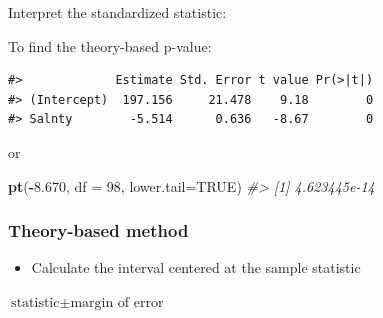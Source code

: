 \documentclass[
]{report}
\newenvironment{Shaded}{\begin{snugshade}}{\end{snugshade}}
\newcommand{\AttributeTok}[1]{\textcolor[rgb]{0.13,0.29,0.53}{#1}}
\newcommand{\CommentTok}[1]{\textcolor[rgb]{0.56,0.35,0.01}{\textit{#1}}}
\newcommand{\ConstantTok}[1]{\textcolor[rgb]{0.56,0.35,0.01}{#1}}
\newcommand{\DecValTok}[1]{\textcolor[rgb]{0.00,0.00,0.81}{#1}}
\newcommand{\FloatTok}[1]{\textcolor[rgb]{0.00,0.00,0.81}{#1}}
\newcommand{\FunctionTok}[1]{\textcolor[rgb]{0.13,0.29,0.53}{\textbf{#1}}}
\newcommand{\NormalTok}[1]{#1}
\newcommand{\OtherTok}[1]{\textcolor[rgb]{0.56,0.35,0.01}{#1}}
\newcommand{\SpecialCharTok}[1]{\textcolor[rgb]{0.81,0.36,0.00}{\textbf{#1}}}
\providecommand{\tightlist}{%
  \setlength{\itemsep}{0pt}\setlength{\parskip}{0pt}}
\newcommand{\rgi}{\hspace{24pt}}  %
\begin{document}
Interpret the standardized statistic:

\vspace{0.8in}

To find the theory-based p-value:

\begin{Shaded}
\end{Shaded}

\begin{verbatim}
#>             Estimate Std. Error t value Pr(>|t|)
#> (Intercept)  197.156     21.478    9.18        0
#> Salnty        -5.514      0.636   -8.67        0
\end{verbatim}

or

\begin{Shaded}
\begin{Highlighting}[]
\FunctionTok{pt}\NormalTok{(}\SpecialCharTok{{-}}\FloatTok{8.670}\NormalTok{, }\AttributeTok{df =} \DecValTok{98}\NormalTok{, }\AttributeTok{lower.tail=}\ConstantTok{TRUE}\NormalTok{)}
\CommentTok{\#\textgreater{} [1] 4.623445e{-}14}
\end{Highlighting}
\end{Shaded}

\newpage

\subsubsection*{Theory-based method}\label{theory-based-method}

\begin{itemize}
\tightlist
\item
  Calculate the interval centered at the sample statistic
\end{itemize}

\rgi \(\text{statistic} \pm \text{margin of error}\)

\vspace{0.6in}

\begin{Shaded}
\end{Shaded}
\end{document}
